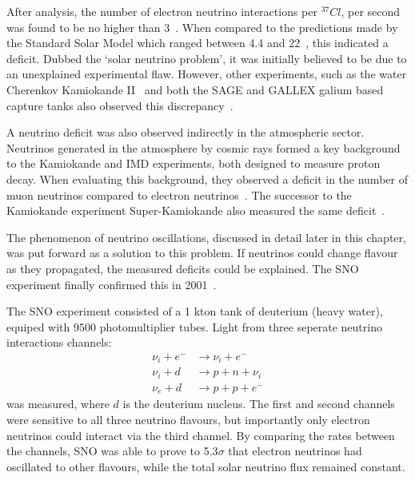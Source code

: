 After analysis, the number of electron neutrino interactions per ${}^{37}Cl$, per second was found
to be no higher than 3~\cite{davis1968}. When compared to the predictions made by the Standard
Solar Model which ranged between 4.4 and 22~\cite{bahcall1968}, this indicated a deficit. Dubbed
the `solar neutrino problem', it was initially believed to be due to an unexplained experimental
flaw. However, other experiments, such as the water Cherenkov Kamiokande II~\cite{hirata1989} and
both the SAGE and GALLEX galium based capture tanks also observed this
discrepancy~\cite{abazov1991,anselmann1994}.

A neutrino deficit was also observed indirectly in the atmospheric sector. Neutrinos generated in
the atmosphere by cosmic rays formed a key background to the Kamiokande and IMD experiments, both
designed to measure proton decay. When evaluating this background, they observed a deficit in the
number of muon neutrinos compared to electron neutrinos~\cite{hirata1988, becker1992}. The
successor to the Kamiokande experiment Super-Kamiokande also measured the same
deficit~\cite{kajita1999}.

The phenomenon of neutrino oscillations, discussed in detail later in this chapter, was put
forward as a solution to this problem. If neutrinos could change flavour as they propagated, the
measured deficits could be explained. The SNO experiment finally confirmed this in
2001~\cite{ahmad2002}.

The SNO experiment consisted of a 1 kton tank of deuterium (heavy water), equiped with 9500
photomultiplier tubes. Light from three seperate neutrino interactions channels:
\begin{align} %
    \nu_{i}+e^{-} & \rightarrow \nu_{i}+e^{-} \\
    \nu_{i}+d     & \rightarrow p+n+\nu_{i}   \\
    \nu_{e}+d     & \rightarrow p+p+e^{-}
\end{align} %
was measured, where $d$ is the deuterium nucleus. The first and second channels were sensitive to
all three neutrino flavours, but importantly only electron neutrinos could interact via the third
channel. By comparing the rates between the channels, SNO was able to prove to 5.3$\sigma$ that
electron neutrinos had oscillated to other flavours, while the total solar neutrino flux remained
constant.

